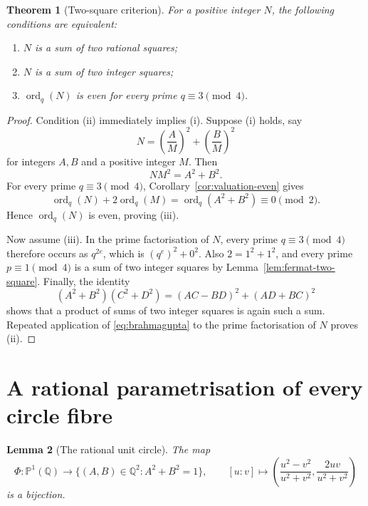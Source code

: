 \documentclass[11pt]{article}
\numberwithin{equation}{section}
\newtheorem{theorem}{Theorem}[section]
\newtheorem{lemma}[theorem]{Lemma}
\theoremstyle{definition}
\theoremstyle{remark}
\newcommand{\Q}{\mathbb{Q}}
\newcommand{\Pone}{\mathbb{P}^{1}}
\newcommand{\ord}{\operatorname{ord}}
\begin{document}
\begin{theorem}[Two-square criterion]\label{thm:two-square}
For a positive integer $N$, the following conditions are equivalent:
\begin{enumerate}[label=\textup{(\roman*)},leftmargin=2.5em]
 \item $N$ is a sum of two rational squares;
 \item $N$ is a sum of two integer squares;
 \item $\ord_{q}(N)$ is even for every prime $q\equiv3\pmod4$.
\end{enumerate}
\end{theorem}

\begin{proof}
Condition (ii) immediately implies (i).  Suppose (i) holds, say
\[
 N=\left(\frac{A}{M}\right)^{2}
  +\left(\frac{B}{M}\right)^{2}
\]
for integers $A,B$ and a positive integer $M$.  Then
\[
 NM^{2}=A^{2}+B^{2}.
\]
For every prime $q\equiv3\pmod4$, Corollary~\ref{cor:valuation-even}
gives
\[
 \ord_{q}(N)+2\ord_{q}(M)
 =\ord_{q}(A^{2}+B^{2})\equiv0\pmod2.
\]
Hence $\ord_{q}(N)$ is even, proving (iii).

Now assume (iii).  In the prime factorisation of $N$, every prime
$q\equiv3\pmod4$ therefore occurs as $q^{2e}$, which is
$(q^{e})^{2}+0^{2}$.  Also $2=1^{2}+1^{2}$, and every prime
$p\equiv1\pmod4$ is a sum of two integer squares by
Lemma~\ref{lem:fermat-two-square}.  Finally, the identity
\begin{equation}\label{eq:brahmagupta}
 (A^{2}+B^{2})(C^{2}+D^{2})
 =(AC-BD)^{2}+(AD+BC)^{2}
\end{equation}
shows that a product of sums of two integer squares is again such a
sum.  Repeated application of \eqref{eq:brahmagupta} to the prime
factorisation of $N$ proves (ii).
\end{proof}

\section{A rational parametrisation of every circle fibre}

\begin{lemma}[The rational unit circle]\label{lem:unit-circle}
The map
\begin{equation}\label{eq:unit-param}
 \Phi:\Pone(\Q)\longrightarrow
 \{(A,B)\in\Q^{2}:A^{2}+B^{2}=1\},
 \qquad
 [u:v]\longmapsto
 \left(\frac{u^{2}-v^{2}}{u^{2}+v^{2}},
       \frac{2uv}{u^{2}+v^{2}}\right)
\end{equation}
is a bijection.
\end{lemma}
\end{document}
